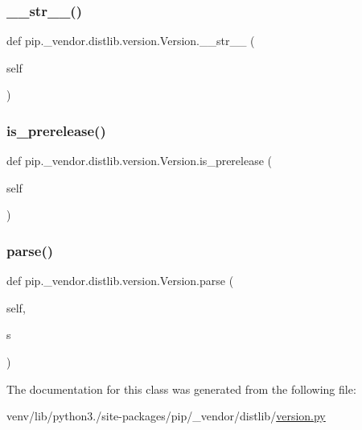 \subsubsection{\texorpdfstring{\+\_\+\+\_\+str\+\_\+\+\_\+()}{\_\_str\_\_()}}
{\footnotesize\ttfamily def pip.\+\_\+vendor.\+distlib.\+version.\+Version.\+\_\+\+\_\+str\+\_\+\+\_\+ (\begin{DoxyParamCaption}\item[{}]{self }\end{DoxyParamCaption})}

\mbox{\label{classpip_1_1__vendor_1_1distlib_1_1version_1_1Version_acc07a1192355549844209f2240a7f3af}} 
\subsubsection{\texorpdfstring{is\+\_\+prerelease()}{is\_prerelease()}}
{\footnotesize\ttfamily def pip.\+\_\+vendor.\+distlib.\+version.\+Version.\+is\+\_\+prerelease (\begin{DoxyParamCaption}\item[{}]{self }\end{DoxyParamCaption})}

\mbox{\label{classpip_1_1__vendor_1_1distlib_1_1version_1_1Version_a150d6fd36991a7754d84626a6819aa27}} 
\subsubsection{\texorpdfstring{parse()}{parse()}}
{\footnotesize\ttfamily def pip.\+\_\+vendor.\+distlib.\+version.\+Version.\+parse (\begin{DoxyParamCaption}\item[{}]{self,  }\item[{}]{s }\end{DoxyParamCaption})}



The documentation for this class was generated from the following file\+:\begin{DoxyCompactItemize}
\item 
venv/lib/python3./site-\/packages/pip/\+\_\+vendor/distlib/\hyperlink{pip_2__vendor_2distlib_2version_8py}{version.\+py}\end{DoxyCompactItemize}
